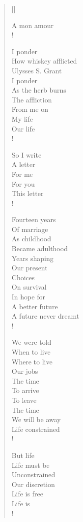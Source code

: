 \documentclass[11pt, a4paper]{article}
\begin{document}

\settowidth{\versewidth}{If you} %

\begin{verse}[\versewidth]

A mon amour \\!

I ponder \\
How whiskey afflicted \\
Ulysses S. Grant \\
I ponder \\
As the herb burns \\
The affliction \\
From me on \\
My life \\
Our life \\!

So I write \\
A letter \\
For me \\
For you \\
This letter \\!

Fourteen years \\ 
Of marriage \\
As childhood  \\
Became adulthood \\
Years shaping \\
Our present \\
Choices \\
On survival \\
In hope for \\
A better future \\
A future never dreamt \\!

We were told \\
When to live \\
Where to live \\
Our jobs \\
The time \\
To arrive \\
To leave \\
The time  \\
We will be away \\
Life constrained \\!

But life  \\
Life must be \\ 
Unconstrained \\
Our discretion \\
Life is free \\
Life is \\!


\end{verse}
\end{document}

